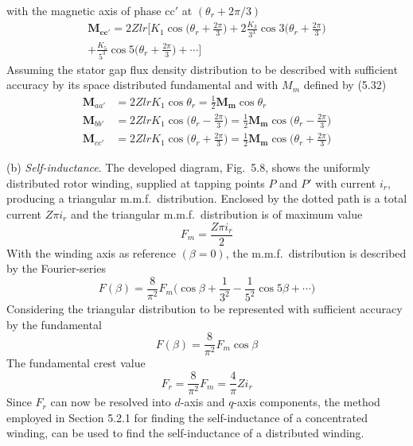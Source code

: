 \documentclass[a4paper,numbers=noenddot,12pt]{scrbook}
\begin{document}
        with the magnetic axis of phase $\textrm{cc}'$ at $(\theta_r + 2 \pi / 3)$
        \begin{multline*}
            \mathbf{M_{cc'}} = 2 Z l r \bigg[ K_1 \cos \bigg(\theta_r + \frac{2 \pi}{3} \bigg) + 2 \frac{K_3}{3^3} \cos 3 \bigg(\theta_r + \frac{2 \pi}{3} \bigg) \\
            + \frac{K_5}{5^3} \cos 5 \bigg( \theta_r + \frac{2 \pi}{3} \bigg ) + \cdots \bigg]
        \end{multline*}
        Assuming the stator gap flux density distribution to be described with sufficient accuracy by its space distributed fundamental and with $M_m$ defined by (5.32)
        \begin{align}
            \boldsymbol M_{aa'} &= 2 Z l r K_1 \cos \theta_r = \frac{1}{2} \mathbf{M_{m}} \cos \theta_r \nonumber \\
            \boldsymbol M_{bb'} &= 2 Z l r K_1 \cos \bigg(\theta_r - \frac{2 \pi}{3} \bigg ) = \frac{1}{2} \mathbf{M_{m}} \cos \bigg( \theta_r - \frac{2\pi}{3} \bigg) \\
            \boldsymbol M_{cc'} &= 2 Z l r K_1 \cos \bigg( \theta_r + \frac{2 \pi}{3} \bigg) = \frac{1}{2} \mathbf{M_{m}} \cos \bigg( \theta_r + \frac{2 \pi}{3} \bigg) \nonumber
        \end{align}

        \noindent (b) \textit{Self-inductance}. The developed diagram, Fig.\ 5.8, shows the uniformly distributed rotor winding, supplied at tapping points $P$ and $P'$ with current $i_r$, producing a triangular m.m.f.\  distribution. Enclosed by the dotted path is a total current $Z \pi i_r$ and the triangular m.m.f.\ distribution is of maximum value
        \begin{equation}
            F_m = \frac{Z \pi i_r}{2}
        \end{equation}
        With the winding axis as reference $(\beta = 0)$, the m.m.f.\ distribution is described by the Fourier-series
        \begin{equation}
            F(\beta) = \frac{8}{\pi^2} F_m \bigg(\cos \beta + \frac{1}{3^2} - \frac{1}{5^2} \cos 5 \beta + \cdots)
        \end{equation}
        Considering the triangular distribution to be represented with sufficient accuracy by the fundamental
        \begin{equation*}
            F(\beta) = \frac{8}{\pi^2}F_m \cos \beta
        \end{equation*}
        The fundamental crest value
        \begin{equation}
            F_r = \frac{8}{\pi^2}F_m = \frac{4}{\pi} Z i_r
        \end{equation}
        Since $F_r$ can now be resolved into $d$-axis and $q$-axis components, the method employed in Section 5.2.1 for finding the self-inductance of a concentrated winding, can be used to find the self-inductance of a distributed winding.
\end{document}
